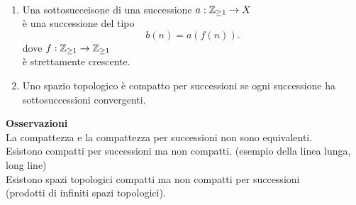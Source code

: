\documentclass[12px]{article}
\begin{document}
\begin{defi}[Sottosuccessioni]\
	\text{ }
	\begin{enumerate}
		\item Una sottosucceisone di una successione $a: \mathbb{Z}_{\geq 1} \rightarrow X$\\
			è una successione del tipo
			\[
			b(n) = a(f(n))
			.\] 
			dove $f:\mathbb{Z}_{\geq 1} \rightarrow \mathbb{Z}_{\geq 1}$ \\
			è strettamente crescente.
		\item Uno spazio topologico è compatto per successioni se ogni successione ha sottosuccessioni convergenti.
	\end{enumerate}
\end{defi}
\textbf{Osservazioni}\\
La compattezza e la compattezza per successioni non sono equivalenti.\\
Esistono compatti per successioni ma non compatti. (esempio della linea lunga, long line)\\
Esistono spazi topologici compatti ma non compatti per successioni\\
(prodotti di infiniti spazi topologici).
\end{document}
